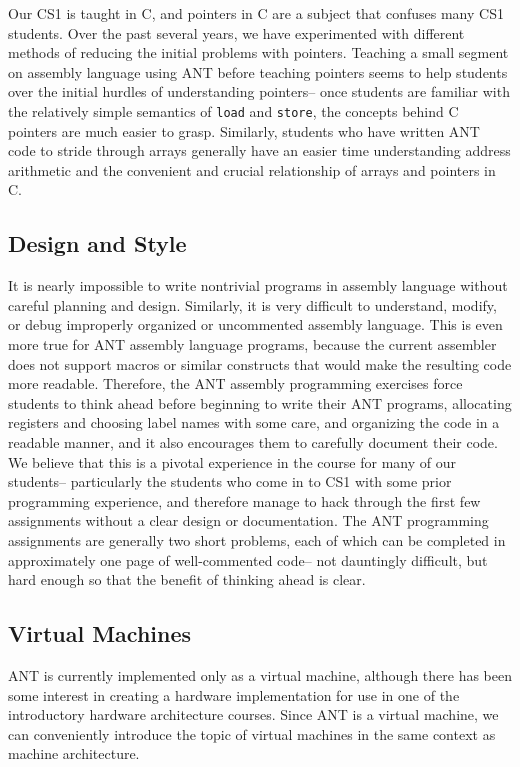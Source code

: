 Our CS1 is taught in C, and pointers in C are a subject that confuses
many CS1 students.  Over the past several years, we have experimented
with different methods of reducing the initial problems with pointers. 
Teaching a small segment on assembly language using ANT before
teaching pointers seems to help students over the initial hurdles of
understanding pointers-- once students are familiar with the
relatively simple semantics of {\tt load} and {\tt store}, the
concepts behind C pointers are much easier to grasp.  Similarly,
students who have written ANT code to stride through arrays generally
have an easier time understanding address arithmetic and the
convenient and crucial relationship of arrays and pointers in C.

\subsection{Design and Style}

It is nearly impossible to write nontrivial programs in assembly
language without careful planning and design.  Similarly, it is very
difficult to understand, modify, or debug improperly organized or
uncommented assembly language.  This is even more true for ANT
assembly language programs, because the current assembler does not
support macros or similar constructs that would make the resulting
code more readable. Therefore, the ANT assembly programming exercises
force students to think ahead before beginning to write their ANT
programs, allocating registers and choosing label names with some
care, and organizing the code in a readable manner, and it also
encourages them to carefully document their code.  We believe that
this is a pivotal experience in the course for many of our students--
particularly the students who come in to CS1 with some prior
programming experience, and therefore manage to hack through the
first few assignments without a clear design or documentation.
The ANT programming assignments are generally two short problems, each
of which can be completed in approximately one page of well-commented
code-- not dauntingly difficult, but hard enough so that the benefit
of thinking ahead is clear.

\subsection{Virtual Machines}

ANT is currently implemented only as a virtual machine, although there
has been some interest in creating a hardware implementation for use
in one of the introductory hardware architecture courses.  Since ANT
is a virtual machine, we can conveniently introduce the topic of
virtual machines in the same context as machine architecture.

